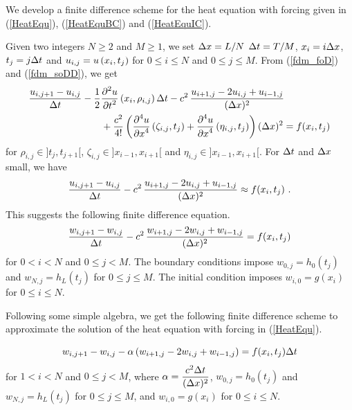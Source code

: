 We develop a finite difference scheme for the heat equation with
forcing given in (\ref{HeatEqu}), (\ref{HeatEquBC}) and
(\ref{HeatEquIC}).

Given two integers $N\geq 2$ and $M\geq 1$, we set $\Delta{x} = L/N$
$\Delta{t} = T/M$, $x_i = i \Delta{x}$, $t_j = j \Delta{t}$ and
$\displaystyle u_{i,j} = u\left(x_i,t_j\right)$
for $0\leq i \leq N$ and $0\leq j \leq M$.
From (\ref{fdm_foD}) and (\ref{fdm_soDD}), we get
\begin{equation}\label{fdm_sch1_tr}
\begin{split}
\frac{u_{i,j+1}- u_{i,j}}{\Delta{t}} &-
\frac{1}{2} \frac{\displaystyle \partial^{2}{u}} {\displaystyle \partial{t}^{2}}\left(x_i,\rho_{i,j}\right) \Delta{t} - c^2 \,
\frac{u_{i+1,j} - 2u_{i,j} + u_{i-1,j}}{(\Delta{x})^2} \\
& \quad\quad + \frac{c^2}{4!}
\left( \frac{\displaystyle \partial^{4}{u}} {\displaystyle \partial{x}^{4}}\left(\zeta_{i,j},t_j\right)
+ \frac{\displaystyle \partial^{4}{u}} {\displaystyle \partial{x}^{4}}\left(\eta_{i,j},t_j\right) \right) (\Delta{x})^2 = f(x_i,t_j)
\end{split}
\end{equation}
for $\rho_{i,j} \in ]t_j,t_{j+1}[$,
$\zeta_{i,j} \in ]x_{i-1},x_{i+1}[$ and
$\eta_{i,j} \in ]x_{i-1},x_{i+1}[$.  For $\Delta{t}$ and $\Delta{x}$ small,
we have
\[
\frac{u_{i,j+1}- u_{i,j}}{\Delta{t}} - c^2 \,
\frac{u_{i+1,j} - 2u_{i,j} + u_{i-1,j}}{(\Delta{x})^2} \approx f(x_i,t_j) \ .
\]
This suggests the following finite difference equation.
\begin{equation} \label{fdm_sch1}
\frac{w_{i,j+1}- w_{i,j}}{\Delta{t}} - c^2 \,
\frac{w_{i+1,j} - 2w_{i,j} + w_{i-1,j}}{(\Delta{x})^2} = f(x_i,t_j)
\end{equation}
for $0 < i <N$ and $0 \leq j < M$.  The boundary conditions impose
$w_{0,j} = h_0(t_j)$ and $w_{N,j} =  h_L(t_j)$ for $0\leq j \leq M$.
The initial condition imposes $w_{i,0} = g(x_i)$ for $0 \leq i \leq N$.

Following some simple algebra, we get the following finite difference
scheme to approximate the solution of the heat equation with forcing
in (\ref{HeatEqu}).

\begin{algo} \label{fdm_sch1S}
\[
w_{i,j+1} - w_{i,j} - \alpha \left( w_{i+1,j} - 2w_{i,j} +
w_{i-1,j}\right) = f(x_i,t_j) \Delta{t}
\]
for $1 < i <N$ and $0 \leq j < M$, where
$\displaystyle \alpha = \frac{c^2\Delta{t}}{(\Delta{x})^2}$,
$w_{0,j} = h_0(t_j)$ and $w_{N,j} = h_L(t_j)$ for $0\leq j \leq M$, and
$w_{i,0} = g(x_i)$ for $0 \leq i \leq N$.
\end{algo}


